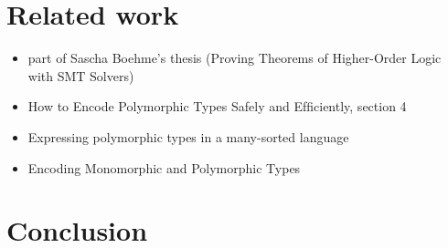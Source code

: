 \documentclass{article}
\begin{document}
\break

\section{Related work}

\begin{itemize}
    \item part of Sascha Boehme's thesis (Proving Theorems of Higher-Order Logic with SMT Solvers)
    \item How to Encode Polymorphic Types Safely and Efﬁciently, section 4

    \item Expressing polymorphic types in a many-sorted language
    \item Encoding Monomorphic and Polymorphic Types
\end{itemize}

\section{Conclusion}


\end{document}
